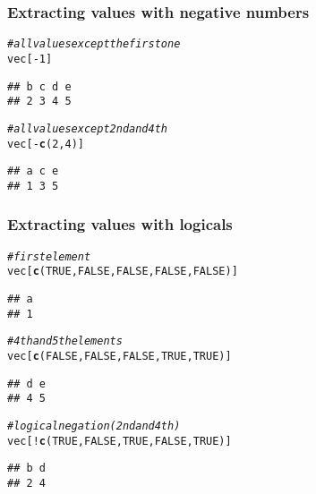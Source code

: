 \documentclass[12pt]{beamer}\usepackage[]{graphicx}\usepackage[]{color}
\makeatletter
\newcommand{\hlnum}[1]{\textcolor[rgb]{0.686,0.059,0.569}{#1}}%
\newcommand{\hlcom}[1]{\textcolor[rgb]{0.678,0.584,0.686}{\textit{#1}}}%
\newcommand{\hlopt}[1]{\textcolor[rgb]{0,0,0}{#1}}%
\newcommand{\hlstd}[1]{\textcolor[rgb]{0.345,0.345,0.345}{#1}}%
\newcommand{\hlkwd}[1]{\textcolor[rgb]{0.737,0.353,0.396}{\textbf{#1}}}%
\newenvironment{kframe}{%
 \def\at@end@of@kframe{}%
 \ifinner\ifhmode%
  \def\at@end@of@kframe{\end{minipage}}%
  \begin{minipage}{\columnwidth}%
 \fi\fi%
 \def\FrameCommand##1{\hskip\@totalleftmargin \hskip-\fboxsep
 \colorbox{shadecolor}{##1}\hskip-\fboxsep
     \hskip-\linewidth \hskip-\@totalleftmargin \hskip\columnwidth}%
 \MakeFramed {\advance\hsize-\width
   \@totalleftmargin\z@ \linewidth\hsize
   \@setminipage}}%
 {\par\unskip\endMakeFramed%
 \at@end@of@kframe}
\newenvironment{knitrout}{}{} %
\makeatother
\begin{document}

\begin{frame}[fragile]
\frametitle{Extracting values with negative numbers}

\begin{knitrout}\footnotesize
{}\color{fgcolor}\begin{kframe}
\begin{alltt}
\hlcom{# all values except the first one}
\hlstd{vec[}\hlopt{-}\hlnum{1}\hlstd{]}
\end{alltt}
\begin{verbatim}
## b c d e 
## 2 3 4 5
\end{verbatim}
\begin{alltt}
\hlcom{# all values except 2nd and 4th}
\hlstd{vec[}\hlopt{-}\hlkwd{c}\hlstd{(}\hlnum{2}\hlstd{,} \hlnum{4}\hlstd{)]}
\end{alltt}
\begin{verbatim}
## a c e 
## 1 3 5
\end{verbatim}
\end{kframe}
\end{knitrout}

\end{frame}


\begin{frame}[fragile]
\frametitle{Extracting values with logicals}

\begin{knitrout}\footnotesize
{}\color{fgcolor}\begin{kframe}
\begin{alltt}
\hlcom{# first element}
\hlstd{vec[}\hlkwd{c}\hlstd{(}\hlnum{TRUE}\hlstd{,} \hlnum{FALSE}\hlstd{,} \hlnum{FALSE}\hlstd{,} \hlnum{FALSE}\hlstd{,} \hlnum{FALSE}\hlstd{)]}
\end{alltt}
\begin{verbatim}
## a 
## 1
\end{verbatim}
\begin{alltt}
\hlcom{# 4th and 5th elements}
\hlstd{vec[}\hlkwd{c}\hlstd{(}\hlnum{FALSE}\hlstd{,} \hlnum{FALSE}\hlstd{,} \hlnum{FALSE}\hlstd{,} \hlnum{TRUE}\hlstd{,} \hlnum{TRUE}\hlstd{)]}
\end{alltt}
\begin{verbatim}
## d e 
## 4 5
\end{verbatim}
\begin{alltt}
\hlcom{# logical negation (2nd and 4th)}
\hlstd{vec[}\hlopt{!}\hlkwd{c}\hlstd{(}\hlnum{TRUE}\hlstd{,} \hlnum{FALSE}\hlstd{,} \hlnum{TRUE}\hlstd{,} \hlnum{FALSE}\hlstd{,} \hlnum{TRUE}\hlstd{)]}
\end{alltt}
\begin{verbatim}
## b d 
## 2 4
\end{verbatim}
\end{kframe}
\end{knitrout}

\end{frame}
\end{document}
